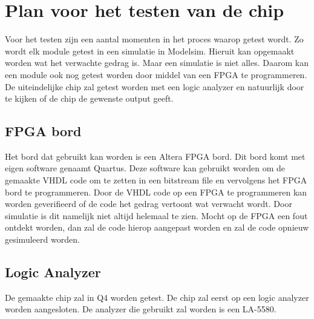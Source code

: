 \chapter{Plan voor het testen van de chip}
Voor het testen zijn een aantal momenten in het proces waarop getest wordt. Zo wordt elk module getest in een simulatie in Modelsim. Hieruit kan opgemaakt worden wat het verwachte gedrag is. Maar een simulatie is niet alles. Daarom kan een module ook nog getest worden door middel van een FPGA te programmeren. De uiteindelijke chip zal getest worden met een logic analyzer en natuurlijk door te kijken of de chip de gewenste output geeft.
\section{FPGA bord}
Het bord dat gebruikt kan worden is een Altera FPGA bord. Dit bord komt met eigen software genaamt Quartus. Deze software kan gebruikt worden om de gemaakte VHDL code om te zetten in een bitstream file en vervolgens het FPGA bord te programmeren. Door de VHDL code op een FPGA te programmeren kan worden geverifieerd of de code het gedrag vertoont wat verwacht wordt. Door simulatie is dit namelijk niet altijd helemaal te zien. Mocht op de FPGA een fout ontdekt worden, dan zal de code hierop aangepast worden en zal de code opnieuw gesimuleerd worden.
\section{Logic Analyzer}
De gemaakte chip zal in Q4 worden getest. De chip zal eerst op een logic analyzer worden aangesloten. De analyzer die gebruikt zal worden is een LA-5580.
